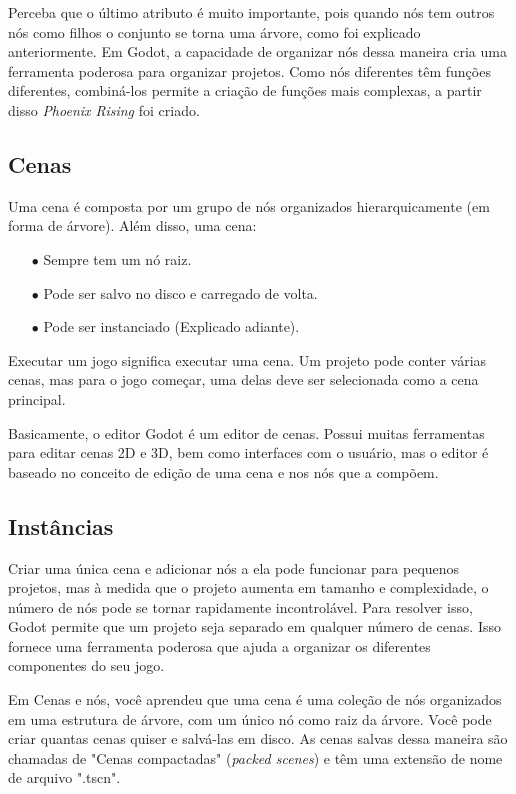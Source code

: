 Perceba que o último atributo é muito importante, pois quando nós tem outros nós
como filhos o conjunto se torna uma árvore, como foi explicado anteriormente.
Em Godot, a capacidade de organizar nós dessa maneira cria uma ferramenta 
poderosa para organizar projetos. Como nós diferentes têm funções diferentes, 
combiná-los permite a criação de funções mais complexas, a partir disso
\textit{Phoenix Rising} foi criado.

\subsection{Cenas}

Uma cena é composta por um grupo de nós organizados hierarquicamente 
(em forma de árvore). Além disso, uma cena:

\begin{itemize}
    \item[$\bullet$]
        Sempre tem um nó raiz.
    \item[$\bullet$]
        Pode ser salvo no disco e carregado de volta.
    \item[$\bullet$]
        Pode ser instanciado (Explicado adiante).
\end{itemize}

Executar um jogo significa executar uma cena. Um projeto pode conter várias 
cenas, mas para o jogo começar, uma delas deve ser selecionada como a cena 
principal.

Basicamente, o editor Godot é um editor de cenas. Possui muitas ferramentas para
editar cenas 2D e 3D, bem como interfaces com o usuário, mas o editor é baseado 
no conceito de edição de uma cena e nos nós que a compõem.

\subsection{Instâncias}

Criar uma única cena e adicionar nós a ela pode funcionar para pequenos 
projetos, mas à medida que o projeto aumenta em tamanho e complexidade, o número
de nós pode se tornar rapidamente incontrolável. Para resolver isso, Godot 
permite que um projeto seja separado em qualquer número de cenas. Isso fornece 
uma ferramenta poderosa que ajuda a organizar os diferentes componentes do seu
jogo.

Em Cenas e nós, você aprendeu que uma cena é uma coleção de nós organizados em 
uma estrutura de árvore, com um único nó como raiz da árvore.
Você pode criar quantas cenas quiser e salvá-las em disco. As cenas salvas dessa
maneira são chamadas de "Cenas compactadas" (\textit{packed scenes}) e têm uma 
extensão de nome de arquivo ".tscn".


